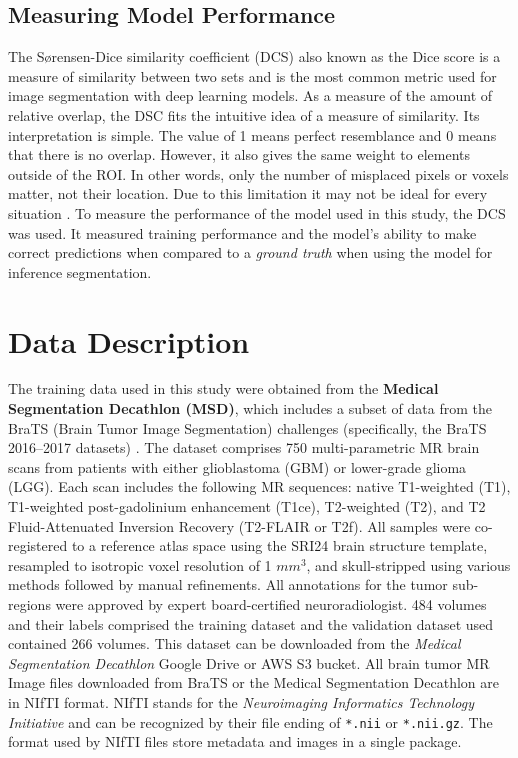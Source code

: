 \documentclass[12pt, onecolumn]{IEEEtran}
\begin{document}
\subsection{Measuring Model Performance}
The Sørensen-Dice similarity coefficient (DCS) also known as the Dice score is a measure of similarity between two sets and is the most common metric used for image segmentation with deep learning models.  As a measure of the amount of relative overlap, the DSC fits the intuitive idea of a measure of similarity.  Its interpretation is simple.  The value of 1 means perfect resemblance and 0 means that there is no overlap.  However, it also gives the same weight to elements outside of the ROI.  In other words, only the number of misplaced pixels or voxels matter, not their location.  Due to this limitation it may not be ideal for every situation \cite{rainio2026}.  To measure the performance of the model used in this study, the DCS was used.  It measured training performance and the model's ability to make correct predictions when compared to a \textit{ground truth} when using the model for inference segmentation.

\section{Data Description}
The training data used in this study were obtained from the \textbf{Medical Segmentation Decathlon (MSD)}, which includes a subset of data from the BraTS (Brain Tumor Image Segmentation) challenges (specifically, the BraTS 2016–2017 datasets) \cite{bakas2017}. The dataset comprises 750 multi-parametric MR brain scans from patients with either glioblastoma (GBM) or lower-grade glioma (LGG). Each scan includes the following MR sequences: native T1-weighted (T1), T1-weighted post-gadolinium enhancement (T1ce), T2-weighted (T2), and T2 Fluid-Attenuated Inversion Recovery (T2-FLAIR or T2f). All samples were co-registered to a reference atlas space using the SRI24 brain structure template, resampled to isotropic voxel resolution of 1 $mm^3$, and skull-stripped using various methods followed by manual refinements.  All annotations for the tumor sub-regions were approved by expert board-certified neuroradiologist\cite{simpson2019}.  484 volumes and their labels comprised the training dataset and the validation dataset used contained 266 volumes.  This dataset can be downloaded from the \textit{Medical Segmentation Decathlon} Google Drive or AWS S3 bucket\cite{decath2022}. All brain tumor MR Image files downloaded from BraTS or the Medical Segmentation Decathlon are in NIfTI format.  NIfTI stands for the \textit{Neuroimaging Informatics Technology Initiative} and can be recognized by their file ending of \texttt{*.nii} or \texttt{*.nii.gz}. The format used by NIfTI files store metadata and images in a single package\cite{nifti}.
\end{document}
